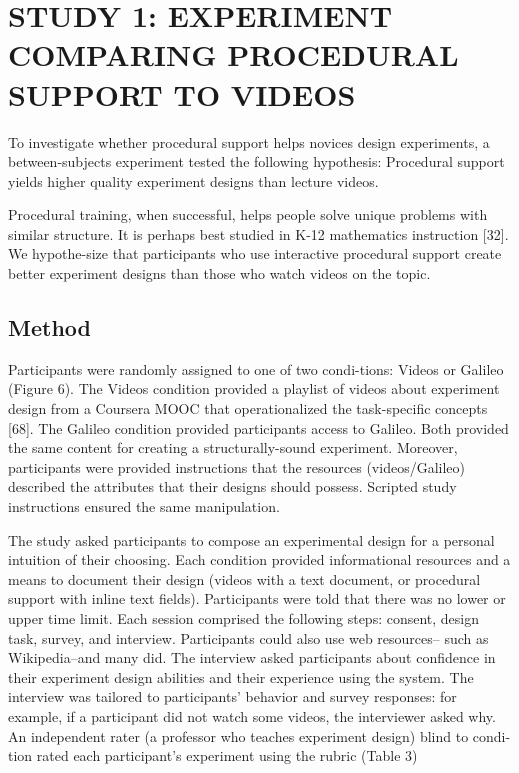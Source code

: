 \section{STUDY 1: EXPERIMENT COMPARING PROCEDURAL SUPPORT TO VIDEOS}
To investigate whether procedural support helps novices design experiments, a between-subjects experiment tested the following hypothesis: Procedural support yields higher quality experiment designs than lecture videos. 

Procedural training, when successful, helps people solve unique problems with similar structure. It is perhaps best studied in K-12 mathematics instruction [32]. We hypothe-size that participants who use interactive procedural support create better experiment designs than those who watch videos on the topic. 

\subsection{Method}
Participants were randomly assigned to one of two condi-tions: Videos or Galileo (Figure 6). The Videos condition provided a playlist of videos about experiment design from a Coursera MOOC that operationalized the task-specific concepts [68]. The Galileo condition provided participants access to Galileo. Both provided the same content for creating a structurally-sound experiment. Moreover, participants were provided instructions that the resources (videos/Galileo) described the attributes that their designs should possess. Scripted study instructions ensured the same manipulation. 

The study asked participants to compose an experimental design for a personal intuition of their choosing. Each condition provided informational resources and a means to document their design (videos with a text document, or procedural support with inline text fields). Participants were told that there was no lower or upper time limit. Each session comprised the following steps: consent, design task, survey, and interview. Participants could also use web resources-- such as Wikipedia--and many did. The interview asked participants about confidence in their experiment design abilities and their experience using the system. The interview was tailored to participants’ behavior and survey responses: for example, if a participant did not watch some videos, the interviewer asked why. An independent rater (a professor who teaches experiment design) blind to condi-tion rated each participant’s experiment using the rubric (Table 3)

